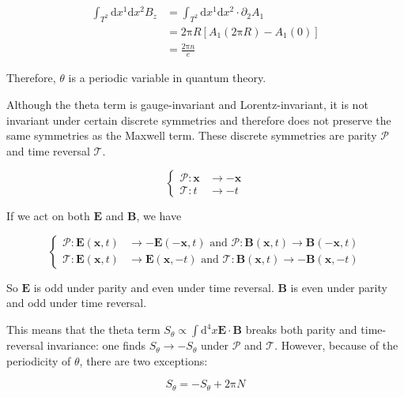 \begin{equation}
\begin{aligned}
\int_{T^2} \mathrm{d}x^1 \mathrm{d}x^2 B_z &= \int_{T^2} \mathrm{d}x^1 \mathrm{d}x^2 \cdot \partial_2 A_1 \\
&= 2\mathrm{\pi} R [A_1(2\mathrm{\pi} R) - A_1(0)] \\
&= \frac{2\mathrm{\pi} n}{e}
\end{aligned}
\end{equation}

Therefore, $\theta$ is a periodic variable in quantum theory.

Although the theta term is gauge-invariant and Lorentz-invariant, it is not invariant under certain discrete symmetries 
and therefore does not preserve the same symmetries as the Maxwell term. These discrete symmetries are parity $\mathcal{P}$ and time reversal $\mathcal{T}$.

\begin{equation}
\left\{
\begin{aligned}
\mathcal{P}: \bm{x} &\to -\bm{x} \\
\mathcal{T}: t &\to -t
\end{aligned}
\right.
\end{equation}

If we act on both $\bm{E}$ and $\bm{B}$, we have

\begin{equation}
\left\{
\begin{aligned}
\mathcal{P}: \bm{E}(\bm{x}, t) &\to -\bm{E}(-\bm{x}, t) \text{ and } \mathcal{P}: \bm{B}(\bm{x}, t) \to \bm{B}(-\bm{x}, t) \\
\mathcal{T}: \bm{E}(\bm{x}, t) &\to \bm{E}(\bm{x}, -t) \text{ and } \mathcal{T}: \bm{B}(\bm{x}, t) \to -\bm{B}(\bm{x}, -t)
\end{aligned}
\right.
\end{equation}

So $\bm{E}$ is odd under parity and even under time reversal. $\bm{B}$ is even under parity and odd under time reversal.

This means that the theta term $S_\theta \propto \int \mathrm{d}^4x \bm{E} \cdot \bm{B}$ breaks both parity and time-reversal invariance: 
one finds $S_\theta \to -S_\theta$ under $\mathcal{P}$ and $\mathcal{T}$. However, because of the periodicity of $\theta$, there are two exceptions:

\begin{equation}
S_\theta = -S_\theta + 2\mathrm{\pi} N
\end{equation}

